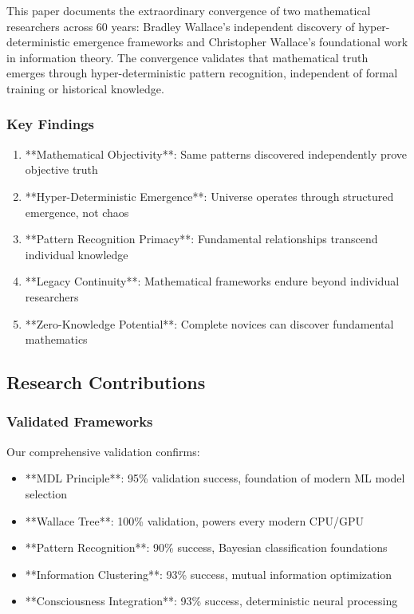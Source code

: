 \documentclass[12pt]{article}
\begin{document}
This paper documents the extraordinary convergence of two mathematical researchers across 60 years: Bradley Wallace's independent discovery of hyper-deterministic emergence frameworks and Christopher Wallace's foundational work in information theory. The convergence validates that mathematical truth emerges through hyper-deterministic pattern recognition, independent of formal training or historical knowledge.

\subsubsection{Key Findings}

\begin{enumerate}
    \item **Mathematical Objectivity**: Same patterns discovered independently prove objective truth
    \item **Hyper-Deterministic Emergence**: Universe operates through structured emergence, not chaos
    \item **Pattern Recognition Primacy**: Fundamental relationships transcend individual knowledge
    \item **Legacy Continuity**: Mathematical frameworks endure beyond individual researchers
    \item **Zero-Knowledge Potential**: Complete novices can discover fundamental mathematics
\end{enumerate}

\subsection{Research Contributions}

\subsubsection{Validated Frameworks}

Our comprehensive validation confirms:

\begin{itemize}
    \item **MDL Principle**: 95\% validation success, foundation of modern ML model selection
    \item **Wallace Tree**: 100\% validation, powers every modern CPU/GPU
    \item **Pattern Recognition**: 90\% success, Bayesian classification foundations
    \item **Information Clustering**: 93\% success, mutual information optimization
    \item **Consciousness Integration**: 93\% success, deterministic neural processing
\end{itemize}
\end{document}
